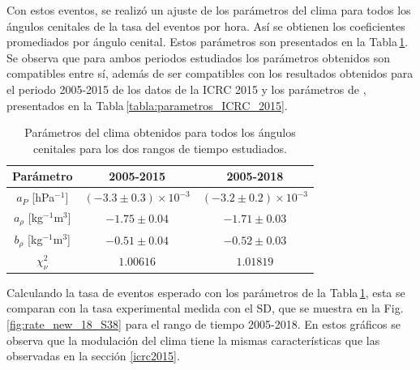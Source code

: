    Con estos eventos, se realizó un  ajuste de los parámetros del clima para todos los ángulos cenitales de la tasa del eventos por hora. Así se obtienen los coeficientes promediados por ángulo cenital. Estos parámetros son presentados en la Tabla\,\ref{tabla:parametros_ICRC_2019_S38}. Se observa que para ambos periodos estudiados los parámetros obtenidos son compatibles entre sí, además de ser compatibles con los resultados obtenidos para el periodo 2005-2015 de los datos de la ICRC 2015 y los parámetros de \cite{aab2017impact}, presentados en la Tabla\,\ref{tabla:parametros_ICRC_2015}.

   \begin{table}[H]
       \centering
       \begin{tabular}{c|c|c}
       {Parámetro}                 & {2005-2015}    		        & {2005-2018}    \\ \hline \hline
       $a_P$ [hPa$^{-1}$]          & $ (-3.3\pm 0.3)\times 10^{-3}$& $(-3.2\pm 0.2)\times 10^{-3}$  \\ \hline
       $a_\rho$ [kg$^{-1}$m$^3$]   & $ -1.75\pm 0.04$            	& $ -1.71\pm 0.03$       \\ \hline
       $b_\rho$ [kg$^{-1}$m$^3$]   & $ -0.51\pm 0.04$             	& $ -0.52\pm 0.03$       \\ \hline
       $\chi^2_\nu$                & $1.00616$                     & $1.01819$              \\   
       \end{tabular} 
       \caption{Parámetros del clima obtenidos para todos los ángulos cenitales para los dos rangos de tiempo estudiados.} \label{tabla:parametros_ICRC_2019_S38}
   \end{table}
   
   Calculando la tasa de eventos esperado con los parámetros de la Tabla\,\ref{tabla:parametros_ICRC_2019_S38}, esta se comparan con la tasa experimental medida con el SD, que se muestra en la Fig. \ref{fig:rate_new_18_S38} para el rango de tiempo 2005-2018. En estos gráficos se observa que la modulación del clima tiene la mismas características que las observadas en la sección \ref{icrc2015}.

